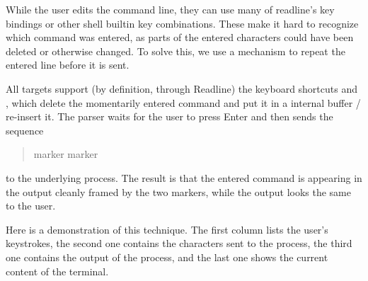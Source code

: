 \documentclass[a4paper,twoside,abstract=on,cleardoublepage=empty,numbers=noenddot,toc=bib]{scrreprt}
\begin{document}
While the user edits the command line, they can use many of readline's key bindings or other shell builtin key combinations. These make it hard to recognize which command was entered, as parts of the entered characters could have been deleted or otherwise changed. To solve this, we use a mechanism to repeat the entered line before it is sent.

All targets support (by definition, through Readline) the keyboard shortcuts  and , which delete the momentarily entered command and put it in a internal buffer / re-insert it. The parser waits for the user to press Enter and then sends the sequence

\begin{quote}
     marker \keys{\backspace}  marker \keys{\backspace} \keys{\return}
\end{quote}

to the underlying process. The result is that the entered command is appearing in the output cleanly framed by the two markers, while the output looks the same to the user.

Here is a demonstration of this technique. The first column lists the user's keystrokes, the second one contains the characters sent to the process, the third one contains the output of the process, and the last one shows the current content of the terminal.
\end{document}
